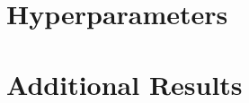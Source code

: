 \section{Hyperparameters}\label{app:hyperparams}

\begin{table}[ht]
  \centering
  \caption{Hyperparameters (placeholder values).}
  \label{tab:hyperparams}
  
\end{table}


\section{Additional Results}\label{app:results}

